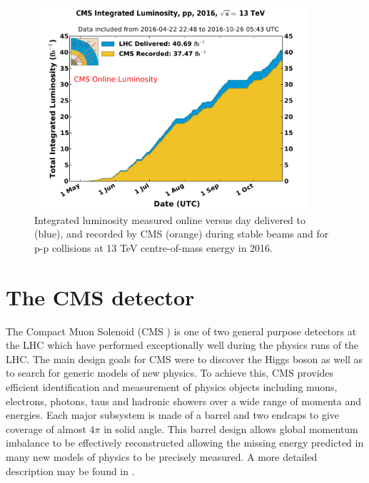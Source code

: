 \begin{figure}
\centering
    \includegraphics[width=0.9\textwidth]{./Figures/detector/int_lumi_per_day_cumulative_pp_2016OnlineLumi}
  \caption{Integrated luminosity measured online versus day delivered to (blue), 
  and recorded by CMS (orange) during stable beams and for p-p collisions at 13 TeV centre-of-mass energy in 2016.}
  \label{fig:LHC-integrated-lumi}
\end{figure}

\section{The CMS detector}
The Compact Muon Solenoid (CMS \cite{CMS}) is one of two general purpose detectors at the LHC 
which have performed exceptionally well during the physics runs of the LHC. The main design goals
for CMS were to discover the Higgs boson as well as to search for generic models 
of new physics. To achieve this, CMS provides efficient identification and measurement
of physics objects including muons, electrons, photons, taus and hadronic showers over a
wide range of momenta and energies. Each major subsystem is made of a barrel
and two endcaps to give coverage of almost $4\pi$ in solid angle. 
This barrel design allows global momentum imbalance to be effectively 
reconstructed allowing the missing energy predicted in many new models of physics to be
precisely measured. A more detailed description may be found in \cite{CMS}.  


